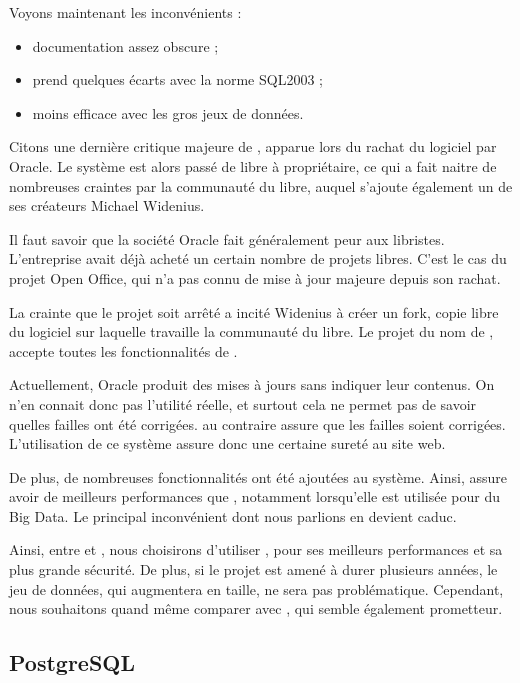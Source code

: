 Voyons maintenant les inconvénients :

\begin{itemize}
\item documentation assez obscure ;
\item prend quelques écarts avec la norme SQL2003 ;
\item moins efficace avec les gros jeux de données. 
\end{itemize} 

\smallbreak

Citons une dernière critique majeure de \mysql, apparue lors du rachat du logiciel par Oracle. Le système est alors  passé de libre à propriétaire, ce qui  a fait naitre de nombreuses craintes par la communauté du libre, auquel s'ajoute également un de ses créateurs Michael Widenius. 

Il faut savoir que la société Oracle fait généralement peur aux libristes. L'entreprise avait déjà acheté un certain nombre de projets libres. C'est le cas du projet Open Office, qui n'a pas connu de mise à jour majeure depuis son rachat. 

La crainte que le projet soit arrêté a incité Widenius à créer un fork, copie libre du logiciel sur laquelle travaille la communauté du libre. Le projet du nom de \mdb, accepte toutes les fonctionnalités  de \mysql. 

\medbreak

Actuellement, Oracle produit des mises à jours sans indiquer leur contenus. On n'en connait donc pas l'utilité réelle, et surtout cela ne permet pas de savoir quelles failles ont été corrigées. \mdb au contraire assure que les failles soient corrigées. L'utilisation de ce système assure donc une certaine sureté au site web. 

De plus, de nombreuses fonctionnalités ont été ajoutées au système. Ainsi, \mdb assure avoir de meilleurs performances que \mysql, notamment lorsqu'elle est utilisée pour du Big Data. Le principal inconvénient dont nous parlions en devient caduc. 

\medbreak

Ainsi, entre \mysql et \mdb, nous choisirons d'utiliser \mdb, pour ses meilleurs performances et sa plus grande sécurité. De plus, si le projet est amené à durer plusieurs années, le jeu de données, qui augmentera en taille, ne sera pas problématique. Cependant, nous souhaitons quand même comparer \mdb avec \psql, qui semble également prometteur. 


\subsection{PostgreSQL}

